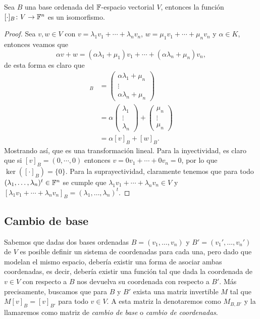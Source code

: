 \begin{prop}
  Sea $B$ una base ordenada del $\mathbb{F}$-espacio vectorial $V$, entonces la función $[\cdot]_B\colon V \to \mathbb{F}^n$ es un isomorfismo.
\end{prop}
\begin{proof}
  Sea $v,w \in V$ con $v = \lambda_1 v_1 + \cdots + \lambda_n v_n$, $w = \mu_1 v_1 + \cdots + \mu_n v_n$ y $\alpha \in K$, entonces veamos que
  \[
  \alpha v+w =  (\alpha\lambda_1+\mu_1) v_1 + \cdots + (\alpha\lambda_n+\mu_n) v_n,
  \]
  de esta forma es claro que
  \begin{align*}
    [v+w]_B 
      &= \begin{pmatrix} \alpha\lambda_1+\mu_n \\ \vdots \\ \alpha\lambda_n+\mu_n \end{pmatrix} \\
      &= \alpha\begin{pmatrix} \lambda_1 \\ \vdots \\ \lambda_n \end{pmatrix}
       + \begin{pmatrix} \mu_n \\ \vdots \\ \mu_n  \end{pmatrix} \\
      &= \alpha[v]_B + [w]_B.
  \end{align*}
  Mostrando así, que es una transformación lineal. Para la inyectividad, es claro que si $[v]_B = (0,\cdots,0)$ entonces $v = 0v_1 + \cdots + 0v_n = 0$, por lo que $\ker([\cdot]_B) = \{0\}$. Para la suprayectividad, claramente tenemos que para todo $(\lambda_1, \ldots, \lambda_n)^t \in \mathbb{F}^n$ se cumple que $\lambda_1 v_1 + \cdots + \lambda_n v_n \in V$ y  $[\lambda_1 v_1 + \cdots  + \lambda_n v_n]_B = (\lambda_1, \ldots, \lambda_n)^t$.
\end{proof}


\subsection{Cambio de base}

Sabemos que dadas dos bases ordenadas $B = (v_1,\ldots,v_n)$ y $B' = (v_1',\ldots,v_n')$ de $V$ es posible definir un sistema de coordenadas para cada una, pero dado que modelan el mismo espacio, debería existir una forma de asociar ambas coordenadas, es decir, debería existir una función tal que dada la coordenada de $v \in V$ con respecto a $B$ nos devuelva su coordenada con respecto a $B'$. Más precisamente, buscamos que para $B$ y $B'$ exista una matriz invertible $M$ tal que $M [v]_B = [v]_{B'}$ para todo $v \in V$. A esta matriz la denotaremos como $M_{B,B'}$ y la llamaremos como matriz de \emph{cambio de base} o \emph{cambio de coordenadas}.

